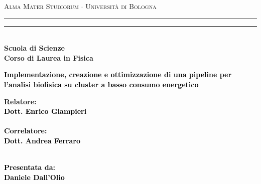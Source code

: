 \documentclass[12pt,a4paper]{report}
\begin{document}
\begin{titlepage}

%
%
%
\begin{center}
{{\Large{\textsc{Alma Mater Studiorum $\cdot$ Universit\`a di Bologna}}}}
\rule[0.1cm]{15.8cm}{0.1mm}
\rule[0.5cm]{15.8cm}{0.6mm}
\\\vspace{3mm}
%
%
{\small{\bf Scuola di Scienze \\ Corso di Laurea in Fisica}}

\end{center}

\vspace{23mm}

\begin{center}\textcolor{black}{
%
%
%
{\LARGE{\bf Implementazione, creazione e ottimizzazione di una pipeline per l'analisi biofisica su cluster a basso consumo energetico}}\\
}\end{center}

\vspace{50mm} \par \noindent

\begin{minipage}[t]{0.47\textwidth}
  {\large
    {\bf Relatore: \vspace{2mm}\\
      \textcolor{black}{
      Dott. Enrico Giampieri}\\\\

	\textcolor{black}{
	\bf Correlatore:
	\vspace{2mm}\\
	Dott. Andrea Ferraro \\\\
	}
    }
  }
\end{minipage}
%
\hfill
%
\begin{minipage}[t]{0.47\textwidth}\raggedleft \textcolor{black}{
{\large{\bf Presentata da:
\vspace{2mm}\\
Daniele Dall'Olio}}}
\end{minipage}


\end{titlepage}
\end{document}
